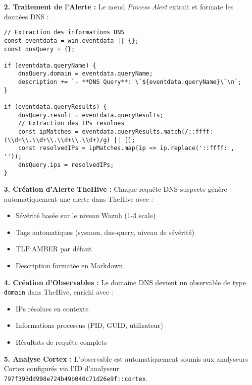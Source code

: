 \textbf{2. Traitement de l'Alerte :}
Le nœud \textit{Process Alert} extrait et formate les données DNS :

\begin{lstlisting}[style=JSStyle, caption=Extraction données DNS, label=lst:dns-extract]
// Extraction des informations DNS
const eventdata = win.eventdata || {};
const dnsQuery = {};

if (eventdata.queryName) {
    dnsQuery.domain = eventdata.queryName;
    description += `- **DNS Query**: \`${eventdata.queryName}\`\n`;
}

if (eventdata.queryResults) {
    dnsQuery.result = eventdata.queryResults;
    // Extraction des IPs resolues
    const ipMatches = eventdata.queryResults.match(/::ffff:(\\d+\\.\\d+\\.\\d+\\.\\d+)/g) || [];
    const resolvedIPs = ipMatches.map(ip => ip.replace('::ffff:', ''));
    dnsQuery.ips = resolvedIPs;
}
\end{lstlisting}

\textbf{3. Création d'Alerte TheHive :}
Chaque requête DNS suspecte génère automatiquement une alerte dans TheHive avec :
\begin{itemize}
    \item Sévérité basée sur le niveau Wazuh (1-3 scale)
    \item Tags automatiques (sysmon, dns-query, niveau de sévérité)
    \item TLP:AMBER par défaut
    \item Description formatée en Markdown
\end{itemize}

\textbf{4. Création d'Observables :}
Le domaine DNS devient un observable de type \texttt{domain} dans TheHive, enrichi avec :
\begin{itemize}
    \item IPs résolues en contexte
    \item Informations processus (PID, GUID, utilisateur)
    \item Résultats de requête complets
\end{itemize}

\textbf{5. Analyse Cortex :}
L'observable est automatiquement soumis aux analyseurs Cortex configurés via l'ID d'analyseur \texttt{797f393dd998e724b49b040c71d26e9f::cortex}.

